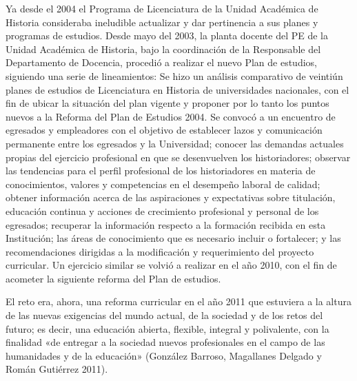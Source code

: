 \enlargethispage{1\baselineskip}
Ya desde el 2004 el Programa de Licenciatura de la Unidad Académica de Historia 
consideraba ineludible actualizar y dar pertinencia a sus planes y 
programas de estudios. Desde mayo del 2003, la planta docente del PE de 
la Unidad Académica de Historia, bajo la coordinación de la Responsable 
del Departamento de Docencia, procedió a realizar el nuevo Plan de 
estudios, siguiendo una serie de lineamientos: Se hizo un análisis 
comparativo de veintiún planes de estudios de Licenciatura en Historia  
de universidades nacionales, con el fin de ubicar la situación del plan 
vigente y proponer por lo tanto los puntos nuevos a la Reforma del Plan 
de Estudios 2004. Se convocó a un encuentro de egresados y empleadores 
con el objetivo de establecer lazos y comunicación permanente entre los 
egresados y la Universidad; conocer las demandas actuales propias del 
ejercicio profesional en que se desenvuelven los historiadores; 
observar las tendencias para el perfil profesional de los historiadores 
en materia de conocimientos, valores y competencias en el desempeño 
laboral de calidad; obtener información acerca de las aspiraciones y 
expectativas sobre titulación, educación continua y acciones de 
crecimiento profesional y personal de los egresados; recuperar la 
información respecto a la formación recibida en esta Institución; las 
áreas de conocimiento que es necesario incluir o fortalecer; y las 
recomendaciones dirigidas a la modificación y requerimiento del 
proyecto curricular. Un ejercicio similar se volvió a realizar en el año  
2010, con el fin de acometer la siguiente reforma del Plan de estudios.

El reto era, ahora, una reforma curricular en el año 2011 que estuviera a la
altura de las nuevas exigencias del mundo actual, de la sociedad y de los
retos del futuro; es decir, una educación abierta, flexible, integral y
polivalente, con la finalidad «de entregar a la sociedad nuevos
profesionales en el campo de las humanidades y de la educación» 
(González Barroso, Magallanes Delgado y Román Gutiérrez 2011). 


